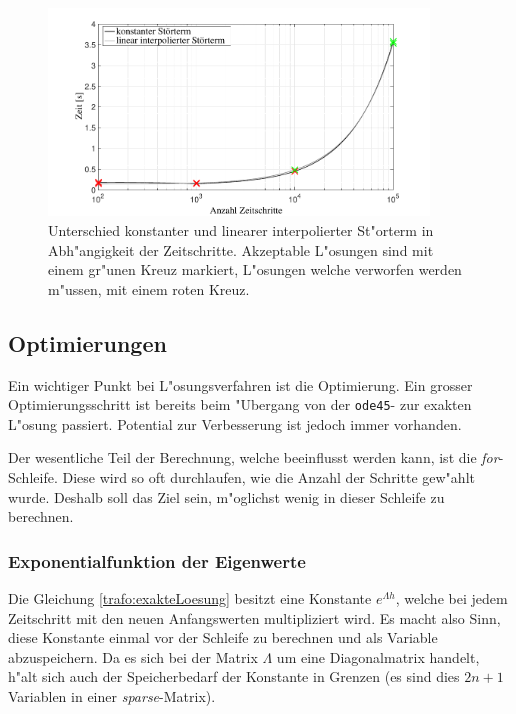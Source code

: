 \begin{refsection}
	
	\begin{figure}
			\centering
			\includegraphics[width=0.9\textwidth]{./trafo/images/differenceTimestep.pdf}
			\caption{Unterschied konstanter und linearer interpolierter St"orterm in Abh"angigkeit der Zeitschritte. Akzeptable L"osungen sind mit einem gr"unen Kreuz markiert, L"osungen welche verworfen werden m"ussen, mit einem roten Kreuz.}
			\label{trafo:differenceTimestep}
	\end{figure}
		
\subsection{Optimierungen \label{trafo:SecOptimierung}}

Ein wichtiger Punkt bei L"osungsverfahren ist die Optimierung. Ein grosser Optimierungsschritt ist bereits beim "Ubergang von der \texttt{ode45}- zur exakten L"osung passiert. Potential zur Verbesserung ist jedoch immer vorhanden.

Der wesentliche Teil der Berechnung, welche beeinflusst werden kann, ist die \textit{for}-Schleife. Diese wird so oft durchlaufen, wie die Anzahl der Schritte gew"ahlt wurde. Deshalb soll das Ziel sein, m"oglichst wenig in dieser Schleife zu berechnen. 

\subsubsection{Exponentialfunktion der Eigenwerte}
Die Gleichung \ref{trafo:exakteLoesung} besitzt eine Konstante $e^{\Lambda h}$, welche bei jedem Zeitschritt mit den neuen Anfangswerten multipliziert wird. Es macht also Sinn, diese Konstante einmal vor der Schleife zu berechnen und als Variable abzuspeichern. Da es sich bei der Matrix $\Lambda$ um eine Diagonalmatrix handelt, h"alt sich auch der Speicherbedarf der Konstante in Grenzen (es sind dies $2n + 1$ Variablen in einer \textit{sparse}-Matrix). 


\end{refsection}
